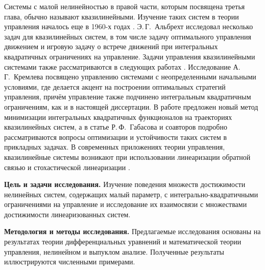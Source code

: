 \documentclass[../main.tex]{subfiles}
\begin{document}
Системы с малой нелинейностью в правой части, которым посвящена третья глава, обычно называют квазилинейными. 
Изучение таких систем в теории управления началось еще в 1960-х годах \cite{Kiselev, Kras_book, Subbotin1967}.
Э.\,Г.~Альбрехт исследовал несколько задач для квазилинейных систем, в том числе задачу оптимального управления движением \cite{Albrecht1} и игровую задачу о встрече движений \cite{Albrecht2} при интегральных квадратичных ограничениях на управление.
Задачи управления квазилинейными системами также рассматриваются в следующих работах \cite{Dauer, Kremlev, KalininLavrinovich2018, Gabasov}.
Исследование А.\,Г.~Кремлева \cite{Kremlev} посвящено управлению системами с неопределенными начальными условиями, где делается акцент на построении оптимальных стратегий управления, причём управление также подчинено интегральным квадратичным ограничениям, как и в настоящей диссертации.
В работе \cite{KalininLavrinovich2018} предложен новый метод минимизации интегральных квадратичных функционалов на траекториях квазилинейных систем, а в статье Р.\,Ф.~Габасова и соавторов \cite{Gabasov} подробно рассматриваются вопросы оптимизации и устойчивости таких систем в прикладных задачах.
В современных приложениях теории управления, квазилинейные системы возникают при использовании линеаризации обратной связью и стохастической линеаризации \cite{Ching, Gui}.


\textbf{Цель и задачи исследования.} Изучение поведения множеств достижимости нелинейных систем, содержащих малый параметр, с интегрально-квадратичными ограничениями на управление и исследование их взаимосвязи с множествами достижимости линеаризованных систем.

\textbf{Методология и методы исследования.} Предлагаемые исследования основаны на результатах теории дифференциальных уравнений и математической теории управления, нелинейном и выпуклом анализе.
Полученные результаты иллюстрируются численными примерами.
\end{document}
